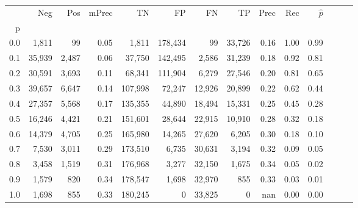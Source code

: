 \begin{tabular}{rrrrrrrrrrrrrr}
\toprule
{} &     Neg &    Pos & mPrec &       TN &       FP &      FN &      TP &  Prec &   Rec & $\hat{p}$ \\
p   &         &        &       &          &          &         &         &       &       &           \\
\midrule
0.0 &   1,811 &     99 &  0.05 &    1,811 &  178,434 &      99 &  33,726 &  0.16 &  1.00 &      0.99 \\
0.1 &  35,939 &  2,487 &  0.06 &   37,750 &  142,495 &   2,586 &  31,239 &  0.18 &  0.92 &      0.81 \\
0.2 &  30,591 &  3,693 &  0.11 &   68,341 &  111,904 &   6,279 &  27,546 &  0.20 &  0.81 &      0.65 \\
0.3 &  39,657 &  6,647 &  0.14 &  107,998 &   72,247 &  12,926 &  20,899 &  0.22 &  0.62 &      0.44 \\
0.4 &  27,357 &  5,568 &  0.17 &  135,355 &   44,890 &  18,494 &  15,331 &  0.25 &  0.45 &      0.28 \\
0.5 &  16,246 &  4,421 &  0.21 &  151,601 &   28,644 &  22,915 &  10,910 &  0.28 &  0.32 &      0.18 \\
0.6 &  14,379 &  4,705 &  0.25 &  165,980 &   14,265 &  27,620 &   6,205 &  0.30 &  0.18 &      0.10 \\
0.7 &   7,530 &  3,011 &  0.29 &  173,510 &    6,735 &  30,631 &   3,194 &  0.32 &  0.09 &      0.05 \\
0.8 &   3,458 &  1,519 &  0.31 &  176,968 &    3,277 &  32,150 &   1,675 &  0.34 &  0.05 &      0.02 \\
0.9 &   1,579 &    820 &  0.34 &  178,547 &    1,698 &  32,970 &     855 &  0.33 &  0.03 &      0.01 \\
1.0 &   1,698 &    855 &  0.33 &  180,245 &        0 &  33,825 &       0 &   nan &  0.00 &      0.00 \\
\bottomrule
\end{tabular}
